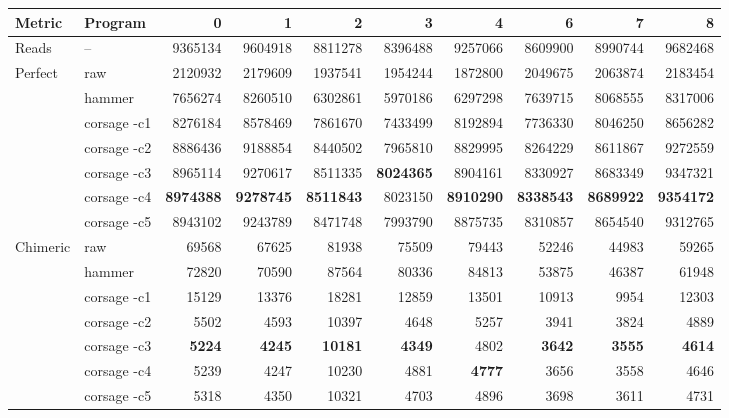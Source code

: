 \documentclass{bioinfo2}
\begin{document}
\begin{table}[p]
{\footnotesize
\begin{tabular}{llrrrrrrrr}
\toprule
Metric   & Program     & 0       & 1       & 2       & 3       & 4       & 6       & 7       & 8 \\
\midrule
Reads    & --          & 9365134 & 9604918 & 8811278 & 8396488 & 9257066 & 8609900 & 8990744 & 9682468 \\
\midrule
Perfect  & raw         & 2120932 & 2179609 & 1937541 & 1954244 & 1872800 & 2049675 & 2063874 & 2183454 \\
         & hammer      & 7656274 & 8260510 & 6302861 & 5970186 & 6297298 & 7639715 & 8068555 & 8317006 \\
         & corsage -c1 & 8276184 & 8578469 & 7861670 & 7433499 & 8192894 & 7736330 & 8046250 & 8656282 \\
         & corsage -c2 & 8886436 & 9188854 & 8440502 & 7965810 & 8829995 & 8264229 & 8611867 & 9272559 \\
         & corsage -c3 & 8965114 & 9270617 & 8511335 & \textbf{8024365} & 8904161 & 8330927 & 8683349 & 9347321 \\
         & corsage -c4 & \textbf{8974388} & \textbf{9278745} & \textbf{8511843} & 8023150 & \textbf{8910290} & \textbf{8338543} & \textbf{8689922} & \textbf{9354172} \\
         & corsage -c5 & 8943102 & 9243789 & 8471748 & 7993790 & 8875735 & 8310857 & 8654540 & 9312765 \\
\midrule
Chimeric & raw         &   69568 &   67625 &   81938 &   75509 &   79443 &   52246 &   44983 &   59265 \\
         & hammer      &   72820 &   70590 &   87564 &   80336 &   84813 &   53875 &   46387 &   61948 \\
         & corsage -c1 &   15129 &   13376 &   18281 &   12859 &   13501 &   10913 &    9954 &   12303 \\
         & corsage -c2 &    5502 &    4593 &   10397 &    4648 &    5257 &    3941 &    3824 &    4889 \\
         & corsage -c3 &    \textbf{5224} &    \textbf{4245} &   \textbf{10181} &    \textbf{4349} &    4802 &    \textbf{3642} &    \textbf{3555} &    \textbf{4614} \\
         & corsage -c4 &    5239 &    4247 &   10230 &    4881 &    \textbf{4777} &    3656 &    3558 &    4646 \\
         & corsage -c5 &    5318 &    4350 &   10321 &    4703 &    4896 &    3698 &    3611 &    4731 \\

\end{tabular}}
\end{table}
\end{document}
